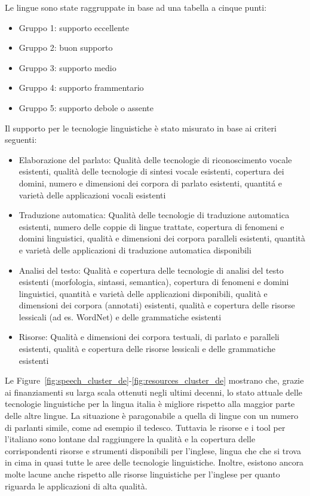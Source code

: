 \documentclass[]{../../metanetpaper}
\begin{document}
\begin{multicols}{2}
Le lingue sono state raggruppate in base ad una tabella a cinque punti:
\begin{itemize}
\item Gruppo 1: supporto eccellente
\item Gruppo 2: buon supporto
\item Gruppo 3: supporto medio
\item Gruppo 4: supporto frammentario
\item Gruppo 5: supporto debole o assente
\end{itemize}


Il supporto per le tecnologie linguistiche è stato misurato in base ai criteri seguenti:

\begin{itemize}
\item Elaborazione del parlato: Qualit\`{a} delle tecnologie di riconoscimento vocale esistenti, qualit\`{a} delle tecnologie
di sintesi vocale esistenti, copertura dei domini, numero e dimensioni dei corpora di parlato esistenti, quantit\'a e variet\`{a}
 delle applicazioni vocali esistenti
\item Traduzione automatica: Qualit\`{a} delle tecnologie di traduzione automatica esistenti, numero delle coppie di lingue trattate, 
copertura di fenomeni e domini linguistici, qualit\`{a} e dimensioni dei corpora paralleli esistenti, quantit\`{a} e variet\`{a} 
delle applicazioni di traduzione automatica disponibili
\item Analisi del testo: Qualit\`{a} e copertura delle tecnologie di analisi del testo esistenti (morfologia, sintassi, semantica),
copertura di fenomeni e domini linguistici, quantit\`{a} e variet\`{a} delle applicazioni disponibili, qualit\`{a} e dimensioni dei
corpora (annotati) esistenti, qualit\`{a} e copertura delle risorse lessicali (ad es. WordNet) e delle grammatiche esistenti
\item Risorse: Qualit\`{a} e dimensioni dei corpora testuali, di parlato e paralleli esistenti, qualit\`{a} e copertura delle risorse lessicali e 
delle grammatiche esistenti
\end{itemize} 

Le Figure~\ref{fig:speech_cluster_de}-\ref{fig:resources_cluster_de} mostrano
che, grazie ai finanziamenti su larga scala ottenuti negli ultimi decenni, lo
stato attuale delle tecnologie linguistiche per la lingua italia \`{e}
migliore rispetto alla maggior parte delle altre lingue. La situazione \`{e}
paragonabile a quella di lingue con un numero di parlanti simile, come ad
esempio il tedesco. Tuttavia le risorse e i tool per l'italiano sono lontane
dal raggiungere la qualit\`{a} e la copertura delle corrispondenti risorse e
strumenti disponibili per l'inglese, lingua che che si trova in cima in quasi
tutte le aree delle tecnologie linguistiche. Inoltre, esistono ancora molte
lacune anche rispetto alle risorse linguistiche per l'inglese per quanto
riguarda le applicazioni di alta qualit\`{a}.



\end{multicols}
\end{document}
